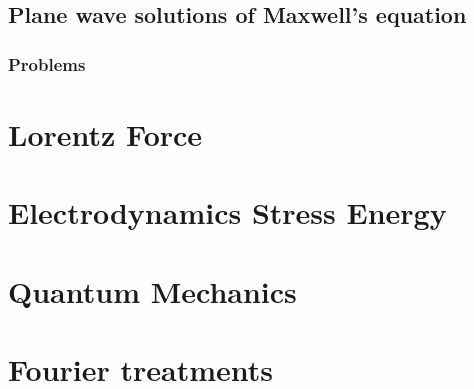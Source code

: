    \chapter{Plane wave solutions of Maxwell's equation}
      
      \section{Problems}
         

\part{Lorentz Force}
   
   
   
   
   

\part{Electrodynamics Stress Energy}
   
   
   
   
   
   
   
   
   
   
   

\part{Quantum Mechanics}
   
   
   
   
   
   
   
   

\part{Fourier treatments}
   
   
   
   
   
   
   
   
   
